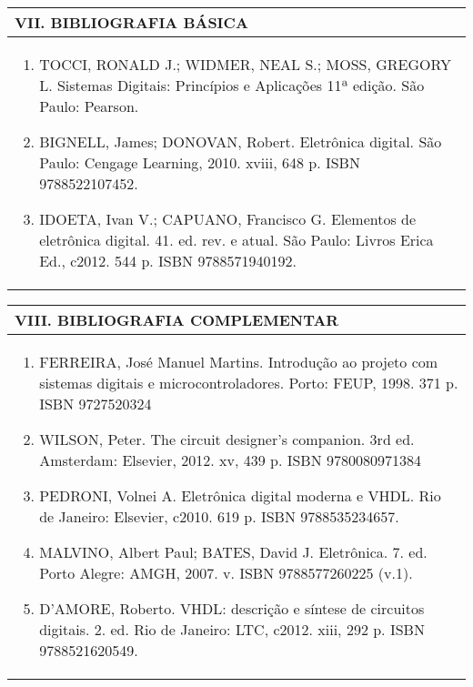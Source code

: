 \documentclass[12pt]{article}
\begin{document}
\begin{longtable}{|L{1.025\textwidth}|} \hline
%
{\bf VII. BIBLIOGRAFIA BÁSICA} \\ \hline

\begin{enumerate}
\item TOCCI, RONALD J.; WIDMER, NEAL S.; MOSS, GREGORY L. Sistemas Digitais: Princípios e Aplicações 11ª edição. São Paulo: Pearson. 
\item BIGNELL, James; DONOVAN, Robert. Eletrônica digital. São Paulo: Cengage Learning, 2010. xviii, 648 p. ISBN 9788522107452. 
\item IDOETA, Ivan V.; CAPUANO, Francisco G. Elementos de eletrônica digital. 41. ed. rev. e atual. São Paulo: Livros Erica Ed., c2012. 544 p. ISBN 9788571940192. 
\end{enumerate}
 \\ \hline
\end{longtable}



\begin{longtable}{|L{1.025\textwidth}|} \hline
%
{\bf VIII. BIBLIOGRAFIA COMPLEMENTAR} \\ \hline
\begin{enumerate}

\item FERREIRA, José Manuel Martins. Introdução ao projeto com sistemas digitais e microcontroladores. Porto: FEUP, 1998. 371 p. ISBN 9727520324 
\item WILSON, Peter. The circuit designer’s companion. 3rd ed. Amsterdam: Elsevier, 2012. xv, 439 p. ISBN 9780080971384
\item PEDRONI, Volnei A. Eletrônica digital moderna e VHDL. Rio de Janeiro: Elsevier, c2010. 619 p. ISBN 9788535234657.
\item MALVINO, Albert Paul; BATES, David J. Eletrônica. 7. ed. Porto Alegre: AMGH, 2007. v. ISBN 9788577260225 (v.1).
\item D’AMORE, Roberto. VHDL: descrição e síntese de circuitos digitais. 2. ed. Rio de Janeiro: LTC, c2012. xiii, 292 p. ISBN 9788521620549.

\end{enumerate}
 \\ \hline
\end{longtable}



\end{document}
